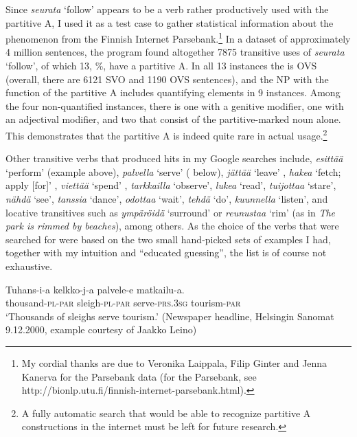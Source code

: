 \documentclass[output=paper]{LSP/langsci}
\begin{document}
Since \textit{seurata} ‘follow’ appears to be a verb rather productively used with the partitive A, I used it as a test case to gather statistical information about the phenomenon from the Finnish Internet Parsebank.\footnote{My cordial thanks are due to Veronika Laippala, Filip Ginter and Jenna Kanerva for the Parsebank data (for the Parsebank, see http://bionlp.utu.fi/finnish-internet-parsebank.html).} In a dataset of approximately 4 million sentences, the program found altogether 7875 transitive uses of \textit{seurata} ‘follow’, of which 13,  \%, have a partitive A. In all 13 instances the  is OVS (overall, there are 6121 SVO and 1190 OVS sentences), and the NP with the function of the partitive A includes quantifying elements in 9 instances. Among the four non-quantified instances, there is one with a genitive modifier, one with an adjectival modifier, and two that consist of the partitive-marked noun alone. This demonstrates that the partitive A is indeed quite rare in actual usage.\footnote{A fully automatic search that would be able to recognize partitive A constructions in the internet must be left for future research.} 

Other transitive verbs that produced hits in my Google searches include, \eg \textit{esittää} ‘perform’ (example  above), \textit{palvella} ‘serve’ ( below), \textit{jättää} ‘leave’ , \textit{hakea} ‘fetch; apply [for]’ , \textit{viettää} ‘spend’ , \textit{tarkkailla} ‘observe’, \textit{lukea} ‘read’, \textit{tuijottaa} ‘stare’, \textit{nähdä} ‘see’, \textit{tanssia} ‘dance’, \textit{odottaa} ‘wait’, \textit{tehdä} ‘do’, \textit{kuunnella} ‘listen’, and locative transitives such as \textit{ympäröidä} ‘surround’ or \textit{reunustaa} ‘rim’ (as in \textit{The park is rimmed by beaches}), among others. As the choice of the verbs that were searched for were based on the two small hand-picked sets of examples I had, together with my intuition and “educated guessing”, the list is of course not exhaustive. 

\ea%
\label{15-hu-ex:15}
\gll Tuhans-i-a kelkko-j-a palvele-e matkailu-a.\\
thousand-\textsc{pl}-\textsc{par} sleigh-\textsc{pl}-\textsc{par} serve-\textsc{prs}.\textsc{3sg} tourism-\textsc{par}\\
\glt ‘Thousands of sleighs serve tourism.’ (Newspaper headline, Helsingin Sanomat 9.12.2000, example courtesy of Jaakko Leino)
\z
\end{document}
